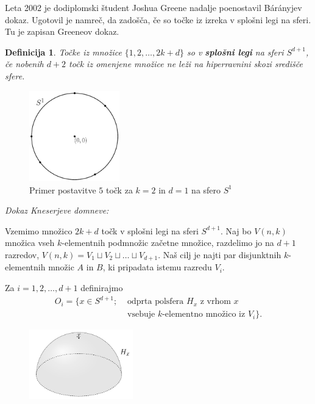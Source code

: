 \documentclass[a4paper,12pt]{article}
\newtheorem{definicija}{Definicija}
\begin{document}
Leta 2002 je dodiplomski študent Joshua Greene nadalje poenostavil Bárányjev dokaz. Ugotovil je namreč, da zadošča, če so točke iz izreka v splošni legi na sferi. Tu je zapisan Greeneov dokaz.

\newpage

\begin{definicija}
Točke iz množice $\{1,2,\ldots,2k+d\}$ so v \textbf {splošni legi} na sferi $S^{d+1}$, če nobenih $d+2$ točk iz omenjene množice ne leži na hiperravnini skozi središče sfere.
\end{definicija}

\begin{figure}[h!]
\centering
\includegraphics[width=0.35\textwidth]{splosna_lega}
\caption{Primer postavitve $5$ točk za $k=2$ in $d=1$ na sfero $S^1$}
\end{figure}


\noindent
{\em Dokaz Kneserjeve domneve:}

\indent Vzemimo množico $2k+d$ točk v splošni legi na sferi $S^{d+1}$. Naj bo $V(n,k)$ množica vseh $k$-elementnih podmnožic začetne množice, razdelimo jo na $d+1$ razredov, $V(n,k) = V_1 \sqcup V_2 \sqcup \ldots \sqcup V_{d+1}$. Naš cilj je najti par disjunktnih $k$-elementnih množic $A$ in $B$, ki pripadata istemu razredu $V_i$.

Za $i=1, 2,\ldots, d+1$ definirajmo
\begin{align*} O_i = \{x \in S^{d+1}; &\text{ odprta polsfera } H_x \text{ z vrhom } x \\ &\text{ vsebuje } k\text{-elementno množico iz } V_i\}.
\end{align*}

\begin{figure}[h!]
\centering
\includegraphics[width=0.4\textwidth]{polsfera}
\end{figure}
\end{document}
